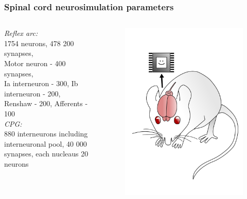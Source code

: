 \documentclass[12pt, aspectratio=169]{beamer}
\begin{document}
\begin{frame}
  \frametitle{Spinal cord neurosimulation parameters}
\begin{columns}[c]

\emph{Reflex arc:}\\
1754 neurons, 478 200 synapses,\\
Motor neuron - 400 synapses,\\
Ia interneuron - 300,
Ib interneuron - 200,\\
Renshaw - 200,
Afferents - 100\\


\emph{CPG:}\\
880 interneurons including interneuronal pool,
40 000 synapses,
each nucleaus 20 neurons

\begin{figure}
\includegraphics[width=1.0\linewidth]{mousebrainpink}
\end{figure}
\end{columns}
\end{frame}

\end{document}
